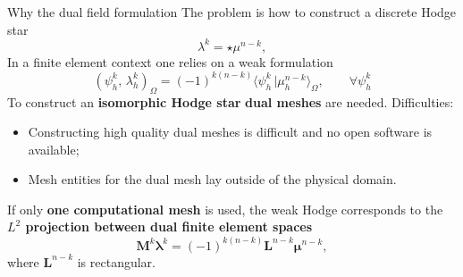 \documentclass[aspectratio=169]{beamer}
\newcommand{\inpr}[3][]{\ensuremath{( #2, \, #3 )_{#1}}}
\newcommand{\dualpr}[3][]{\ensuremath{\langle #2 \, \vert #3 \rangle_{#1}}}
\begin{document}
\begin{frame}{Why the dual field formulation}
	The problem is how to construct a discrete Hodge star
	\begin{equation*}
		\lambda^k = \star \mu^{n-k}, 
	\end{equation*}
	In a finite element context one relies on a weak formulation
	\begin{equation*}
			\inpr[\Omega]{\psi^k_h}{\lambda^k_h} = (-1)^{k(n-k)}\dualpr[\Omega]{\psi^k_h}{\mu^{n-k}_h}, \qquad  \forall \psi^k_h
	\end{equation*}
	To construct an \textbf{isomorphic Hodge star} \textbf{dual meshes} are needed. Difficulties:
	\begin{itemize}
		\item Constructing high quality dual meshes is difficult and no open software is available;
		\item Mesh entities for the dual mesh lay outside of the physical domain.
	\end{itemize}
	


	If only \textbf{one computational mesh} is used, the weak Hodge corresponds to the \textbf{$L^2$ projection between dual finite element spaces}
	\begin{equation*}
	 \mathbf{M}^k \bm{\lambda}^k =(-1)^{k(n-k)} \mathbf{L}^{n-k} \bm{\mu}^{n-k},
	\end{equation*}
	where $\mathbf{L}^{n-k}$ is rectangular.
\end{frame}
\end{document}
